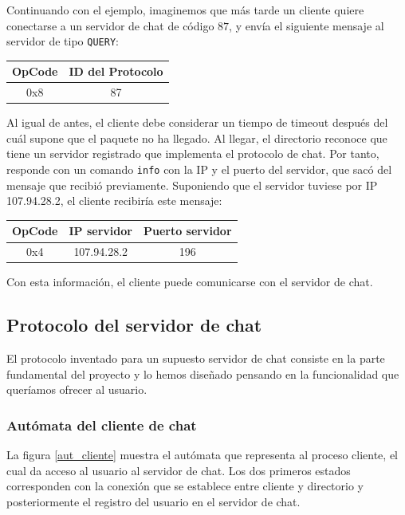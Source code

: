 Continuando con el ejemplo, imaginemos que más tarde un cliente quiere conectarse a un servidor de chat de código $87$, y envía el siguiente mensaje al servidor de tipo \lstinline!QUERY!:
\begin{center}
\begin{tabular}{|c|c|}\hline
    OpCode & ID del Protocolo \\ \hline
    0x8 & 87 \\ \hline
\end{tabular}
\end{center}
Al igual de antes, el cliente debe considerar un tiempo de timeout después del cuál supone que el paquete no ha llegado. Al llegar, el directorio reconoce que tiene un servidor registrado que implementa el protocolo de chat. Por tanto, responde con un comando \lstinline!info! con la IP y el puerto del servidor, que sacó del mensaje que recibió previamente. Suponiendo que el servidor tuviese por IP 107.94.28.2, el cliente recibiría este mensaje:
\begin{center}
\begin{tabular}{|c|c|c|}\hline
    OpCode & IP servidor  &  Puerto servidor \\ \hline
    0x4 & 107.94.28.2 & 196 \\ \hline
\end{tabular}
\end{center}
Con esta información, el cliente puede comunicarse con el servidor de chat.

\subsection{Protocolo del servidor de chat}
El protocolo inventado para un supuesto servidor de chat consiste en la parte fundamental del proyecto y lo hemos diseñado pensando en la funcionalidad que queríamos ofrecer al usuario.

\subsubsection{Autómata del cliente de chat}
La figura \ref{aut_cliente} muestra el autómata que representa al proceso cliente, el cual da acceso al usuario al servidor de chat. Los dos primeros estados corresponden con la conexión que se establece entre cliente y directorio y posteriormente el registro del usuario en el servidor de chat.

